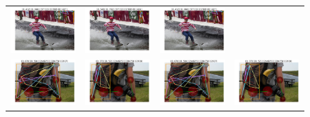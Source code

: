 \documentclass[10pt,onecolumn,letterpaper]{article}
\begin{document}
\begin{figure}[h!]
{\begin{tabular}{cc|cc}
\includegraphics[width=.2\linewidth,height=.15\paperwidth,keepaspectratio]{./result/rmpe/scoring_errors/score_err_1_high_oks.pdf} &
\includegraphics[width=.2\linewidth,height=.15\paperwidth,keepaspectratio]{./result/rmpe/scoring_errors/score_err_1_high_score.pdf} &
\includegraphics[width=.2\linewidth,height=.15\paperwidth,keepaspectratio]{./result/rmpe/scoring_errors/score_err_1_high_oks.pdf}\\
\includegraphics[width=.2\linewidth,height=.15\paperwidth,keepaspectratio]{./result/rmpe/scoring_errors/score_err_2_high_score.pdf} &
\includegraphics[width=.2\linewidth,height=.15\paperwidth,keepaspectratio]{./result/rmpe/scoring_errors/score_err_2_high_oks.pdf} &
\includegraphics[width=.2\linewidth,height=.15\paperwidth,keepaspectratio]{./result/rmpe/scoring_errors/score_err_2_high_score.pdf} &
\includegraphics[width=.2\linewidth,height=.15\paperwidth,keepaspectratio]{./result/rmpe/scoring_errors/score_err_2_high_oks.pdf}\\

\end{tabular}}
\end{figure}
\end{document}

